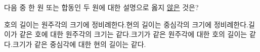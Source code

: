 다음 중 한 원 또는 합동인 두 원에 대한 설명으로 옳지 \underline{않은} 것은?
\begin{choicesv}{호의 길이는 원주각의 크기에 정비례한다.}{현의 길이는 중심각의 크기에 정비례한다.}{길이가 같은 호에 대한 원주각의 크기는 같다.}{크기가 같은 원주각에 대한 호의 길이는 같다.}{크기가 같은 중심각에 대한 현의 길이는 같다.}\end{choicesv}
